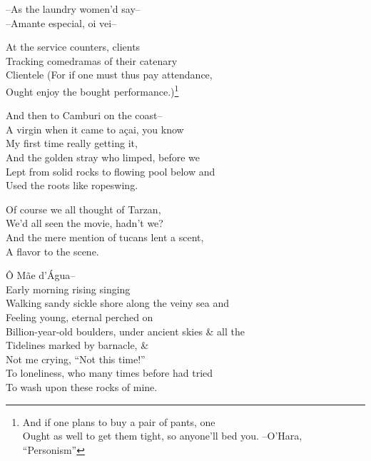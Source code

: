 --As the laundry women'd say-- \\
--Amante especial, oi vei-- 

At the service counters, clients \\
Tracking comedramas of their catenary \\
Clientele (For if one must thus pay attendance, \\ 
Ought enjoy the bought performance.)\footnote{And if one plans to buy a pair of pants, one \\
Ought as well to get them tight, so anyone'll bed you. --O'Hara, ``Personism''}

And then to Camburi on the coast-- \\
A virgin when it came to açai, you know \\
My first time really getting it, \\
And the golden stray who limped, before we \\
Lept from solid rocks to flowing pool below and \\
Used the roots like ropeswing.

Of course we all thought of Tarzan, \\
We'd all seen the movie, hadn't we? \\
And the mere mention of tucans lent a scent, \\
A flavor to the scene.

Ô Mãe d'Água-- \\
Early morning rising singing \\
Walking sandy sickle shore along the veiny sea and \\
Feeling young, eternal perched on \\ 
Billion-year-old boulders, under ancient skies \& all the \\
Tidelines marked by barnacle, \& \\
Not me crying, ``Not this time!'' \\
To loneliness, who many times before had tried \\
To wash upon these rocks of mine.